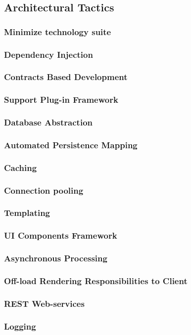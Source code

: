 \subsection{Architectural Tactics}
\subsubsection{Minimize technology suite}
\subsubsection{Dependency Injection}
\subsubsection{Contracts Based Development}
\subsubsection{Support Plug-in Framework}
\subsubsection{Database Abstraction}
\subsubsection{Automated Persistence Mapping}
\subsubsection{Caching}
\subsubsection{Connection pooling}
\subsubsection{Templating}
\subsubsection{UI Components Framework}
\subsubsection{Asynchronous Processing}
\subsubsection{Off-load Rendering Responsibilities to Client}
\subsubsection{REST Web-services}
\subsubsection{Logging}